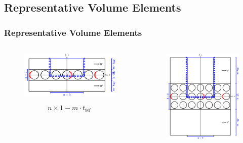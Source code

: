 \documentclass[first,firstsupp,lastsupp,last,hyperref,table]{ETHclass}
\begin{document}
\subsection{Representative Volume Elements}

\begin{frame}
\frametitle{\vspace{0.2cm}\small Representative Volume Elements}
\vspace{-1cm}
\centering
\begin{columns}[c]
\begin{column}{0.55\textwidth}
\centering
\begin{figure}
\centering
\includegraphics[width=\columnwidth]{thinPly.pdf}
\end{figure}
\vspace{-0.25cm}
\begin{equation*}
n\times 1-m\cdot t_{90^{\circ}}
\end{equation*}
\end{column}
\begin{column}{0.45\textwidth}
\centering
\begin{figure}
\centering
\includegraphics[width=\columnwidth]{ThickPly.pdf}

\end{figure}
\end{column}
\end{columns}
\end{frame}
\end{document}
